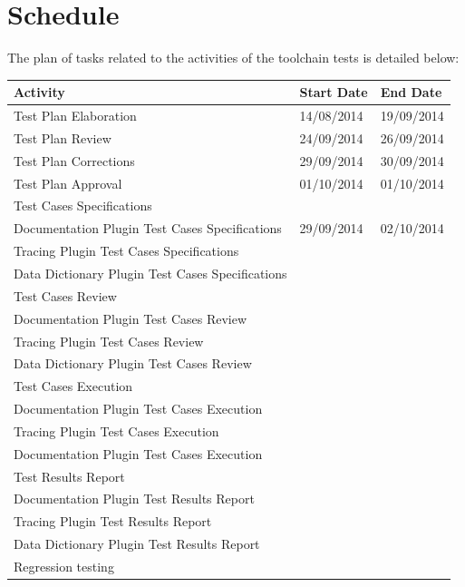 \section{Schedule}
The plan of tasks related to the activities of the toolchain tests is detailed below:
\begin{center}
\begin{longtable}[H]{|p{8cm}|p{3cm}|p{3cm}|}\hline
\textbf{Activity} & \textbf{Start Date} & \textbf{End Date}\\\hline
Test Plan Elaboration & 14/08/2014 & 19/09/2014 \\\hline
Test Plan Review & 24/09/2014 & 26/09/2014\\\hline
Test Plan Corrections & 29/09/2014 & 30/09/2014\\\hline
Test Plan Approval & 01/10/2014 & 01/10/2014\\\hline
\multicolumn{3}{|l|}{Test Cases Specifications}\\\hline
Documentation Plugin Test Cases Specifications & 29/09/2014 & 02/10/2014\\\hline
Tracing Plugin Test Cases Specifications & & \\\hline
Data Dictionary Plugin Test Cases Specifications & & \\\hline
\multicolumn{3}{|l|}{Test Cases Review}\\\hline
Documentation Plugin Test Cases Review & & \\\hline
Tracing Plugin Test Cases Review & & \\\hline
Data Dictionary Plugin Test Cases Review & & \\\hline
\multicolumn{3}{|l|}{Test Cases Execution}\\\hline
Documentation Plugin Test Cases Execution & & \\\hline
Tracing Plugin Test Cases Execution & & \\\hline
Documentation Plugin Test Cases Execution & & \\\hline
\multicolumn{3}{|l|}{Test Results Report}\\\hline
Documentation Plugin Test Results Report & & \\\hline
Tracing Plugin Test Results Report & & \\\hline
Data Dictionary Plugin Test Results Report & & \\\hline
Regression testing & & \\\hline
\end{longtable}
\end{center}


